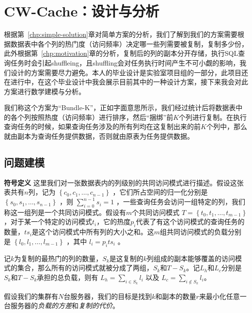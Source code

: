 \chapter{CW-Cache：设计与分析}
\label{chp:cw-cache}

\par 根据第~\ref{chp:simple-solution}章对简单方案的分析，我们了解到我们的方案需要根据数据表中各个列的热门度（访问频率）决定哪一些列需要被复制，复制多少份，此外根据第~\ref{chp:motivation}章的分析，复制后的列的副本分开存储，执行SQL查询任务时会引起shuffleing，且shuffling会对任务执行时间产生不可小觑的影响，我们设计的方案需要尽力避免。本人的毕业设计是实验室项目组的一部分，此项目还在进行中，在这个毕业设计中我会展示目前其中的一种设计方案，接下来我会对此方案进行数学建模与分析。

\par 我们称这个方案为“Bundle-K”，正如字面意思所示，我们经过统计后将数据表中的各个列按照热度（访问频率）进行排序，然后“捆绑”前$K$个列进行复制。在执行查询任务的时候，如果查询任务涉及的所有列均在这复制出来的前$K$个列中，那么就由副本为查询任务提供数据，否则就由原表为任务提供数据。

\section{问题建模}
\label{sec:bundle-k-model}

\par \noindent \textbf{符号定义} \quad 这里我们对一张数据表内的列级别的共同访问模式进行描述。假设这张表共有$n$列，记为 $\left\{c_{0}, c_{1}, \dots, c_{n-1}\right\}$ ，它们所占空间的归一化分别是 $\left\{s_{0}, s_{1}, \dots, s_{n-1}\right\}$ ，则 $\sum_{i=0}^{n-1} s_i = 1$ ，一些查询任务会访问一组特定的列，我们称这一组列是一个共同访问模式。假设有$m$个共同访问模式 $T = \left\{t_{0}, t_{1}, \dots, t_{m-1}\right\}$ ，对于某一个特定的访问模式$t_i$，它的热度$p_i$代表了有这个访问模式的查询任务的数量，$ts_i$是这个访问模式中所有列的大小之和。这$m$组共同访问模式的负载分别是 $\left\{l_{0}, l_{1}, \dots, l_{m-1}\right\}$ ，其中 $l_i = p_i ts_i$ 。

\par 记$k$为复制的最热门的列的数量，$S_k$是这复制的$k$列组成的副本能够覆盖的访问模式的集合，那么所有的访问模式就被分成了两组，$S_k$和$T-S_k$。记$L_h$和$L_c$分别是$S_k$和$T-S_k$承担的总负载，则有 $L_h=\sum_{i \in S_{k}} l_{i}$ 以及 $ L_c = \sum_{i \notin S_{k}} l_{i}$。

\par 假设我们的集群有$N$台服务器，我们的目标是找到$k$和副本的数量$r$来最小化任意一台服务器的\emph{负载的方差}和\emph{复制的代价}。


